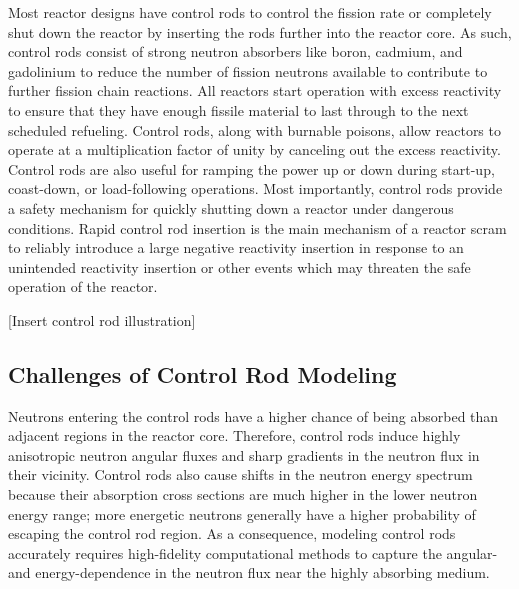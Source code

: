 Most reactor designs have control rods to control the fission rate or
completely shut down the reactor by inserting the rods further into the reactor
core. As such, control rods consist of strong
neutron absorbers like boron, cadmium, and gadolinium to reduce the number of
fission neutrons available to contribute to further fission chain reactions.
All reactors start operation with excess reactivity to ensure that they have
enough fissile material to last through to the next scheduled refueling.
Control rods, along with burnable poisons, allow reactors to operate at a
multiplication factor of unity by canceling out the excess reactivity.
Control rods are also useful for ramping the power up or down during start-up,
coast-down, or load-following operations. Most importantly, control rods
provide a safety mechanism for quickly shutting down a reactor under dangerous
conditions. Rapid control rod insertion is the main mechanism of a reactor
scram to reliably introduce a large negative reactivity insertion in response
to an unintended reactivity insertion or other events which may threaten the
safe operation of the reactor.

[Insert control rod illustration]

\subsection{Challenges of Control Rod Modeling}

Neutrons entering the control rods have a higher chance of being absorbed than
adjacent regions in the reactor core. Therefore, control rods induce highly
anisotropic neutron angular fluxes and sharp gradients in the neutron flux in
their vicinity. Control rods also cause shifts in the neutron energy spectrum
because their absorption cross sections are much higher in the lower neutron
energy range; more energetic neutrons generally have a higher probability of
escaping the control rod region. As a consequence, modeling control rods
accurately requires high-fidelity computational methods to capture the angular-
and energy-dependence in the neutron flux near the highly absorbing medium.


